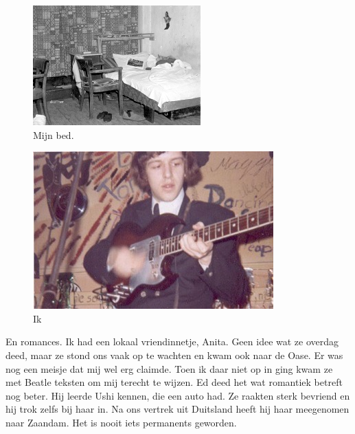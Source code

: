 \documentclass[12pt,twoside, openright]{memoir}
\begin{document}
\begin{figure}
\includegraphics[width=\textwidth]{img/ch29/soest}
\caption*{\footnotesize Mijn bed.}
\end{figure}

\begin{figure}
\includegraphics[width=\textwidth]{img/ch29/rockadzaan4}
\caption*{\footnotesize Ik}
\end{figure}

En romances. Ik had een lokaal vriendinnetje, Anita. Geen idee wat ze overdag deed, maar ze stond ons vaak op te wachten en kwam ook naar de Oase. Er was nog een meisje dat mij wel erg claimde. Toen ik daar niet op in ging kwam ze met Beatle teksten om mij terecht te wijzen. Ed deed het wat romantiek betreft nog beter. Hij leerde Ushi kennen, die een auto had. Ze raakten sterk bevriend en hij trok zelfs bij haar in. Na ons vertrek uit Duitsland heeft hij haar meegenomen naar Zaandam. Het is nooit iets permanents geworden.
\end{document}
